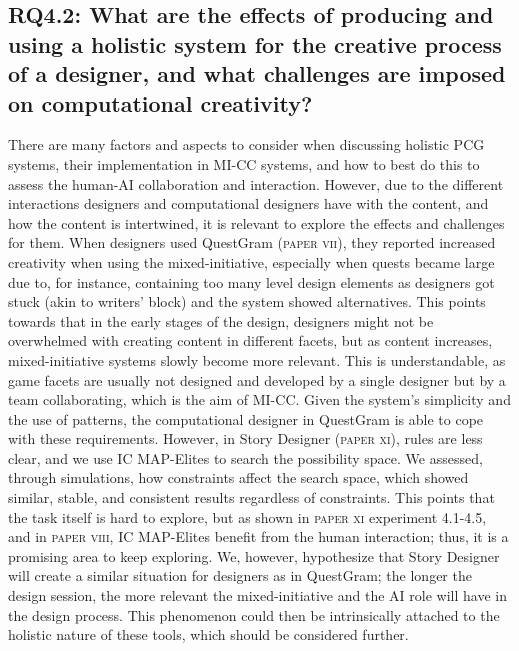 \subsection[Research Question 4.2]{RQ4.2: What are the effects of producing and using a holistic system for the creative process of a designer, and what challenges are imposed on computational creativity?}

There are many factors and aspects to consider when discussing holistic PCG systems, their implementation in MI-CC systems, and how to best do this to assess the human-AI collaboration and interaction. However, due to the different interactions designers and computational designers have with the content, and how the content is intertwined, it is relevant to explore the effects and challenges for them. When designers used QuestGram (\textsc{paper vii}), they reported increased creativity when using the mixed-initiative, especially when quests became large due to, for instance, containing too many level design elements as designers got stuck (akin to writers' block) and the system showed alternatives. This points towards that in the early stages of the design, designers might not be overwhelmed with creating content in different facets, but as content increases, mixed-initiative systems slowly become more relevant. This is understandable, as game facets are usually not designed and developed by a single designer but by a team collaborating, which is the aim of MI-CC. Given the system's simplicity and the use of patterns, the computational designer in QuestGram is able to cope with these requirements. However, in Story Designer (\textsc{paper xi}), rules are less clear, and we use IC MAP-Elites to search the possibility space. We assessed, through simulations, how constraints affect the search space, which showed similar, stable, and consistent results regardless of constraints. This points that the task itself is hard to explore, but as shown in \textsc{paper xi} experiment 4.1-4.5, and in \textsc{paper viii}, IC MAP-Elites benefit from the human interaction; thus, it is a promising area to keep exploring. We, however, hypothesize that Story Designer will create a similar situation for designers as in QuestGram; the longer the design session, the more relevant the mixed-initiative and the AI role will have in the design process. This phenomenon could then be intrinsically attached to the holistic nature of these tools, which should be considered further.


